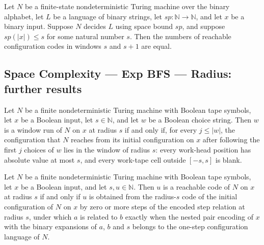 \begin{theorem}
\label{Complexity.ExpBFS.card_rset_succ_of_le}
\leanok
{}
Let $N$ be a finite-state nondeterministic Turing machine over the binary alphabet, let
$L$ be a language of binary strings, let $sp:\mathbb{N}\to\mathbb{N}$, and let $x$ be a
binary input. Suppose $N$ decides $L$ using space bound $sp$, and suppose $sp(|x|)\le s$
for some natural number $s$. Then the numbers of reachable configuration codes in
windows $s$ and $s+1$ are equal.
\end{theorem}

\subsection*{Space Complexity --- Exp BFS --- Radius: further results}

\begin{lemma}
\label{Complexity.ExpBFS.winRun_iff}
\leanok
{}
Let $N$ be a finite nondeterministic Turing machine with Boolean tape symbols, let $x$
be a Boolean input, let $s\in\mathbb{N}$, and let $w$ be a Boolean choice string. Then
$w$ is a window run of $N$ on $x$ at radius $s$ if and only if, for every $j\le|w|$, the
configuration that $N$ reaches from its initial configuration on $x$ after following
the first $j$ choices of $w$ lies in the window of radius $s$: every work-head position
has absolute value at most $s$, and every work-tape cell outside $[-s,s]$ is blank.
\end{lemma}

\begin{lemma}
\label{Complexity.ExpBFS.rcode_iff_reflTransGen}
\leanok
{}
Let $N$ be a finite nondeterministic Turing machine with Boolean tape symbols, let $x$
be a Boolean input, and let $s,u\in\mathbb{N}$. Then $u$ is a reachable code of $N$ on
$x$ at radius $s$ if and only if $u$ is obtained from the radius-$s$ code of the initial
configuration of $N$ on $x$ by zero or more steps of the encoded step relation at
radius $s$, under which $a$ is related to $b$ exactly when the nested pair encoding of
$x$ with the binary expansions of $a$, $b$ and $s$ belongs to the one-step
configuration language of $N$.
\end{lemma}
